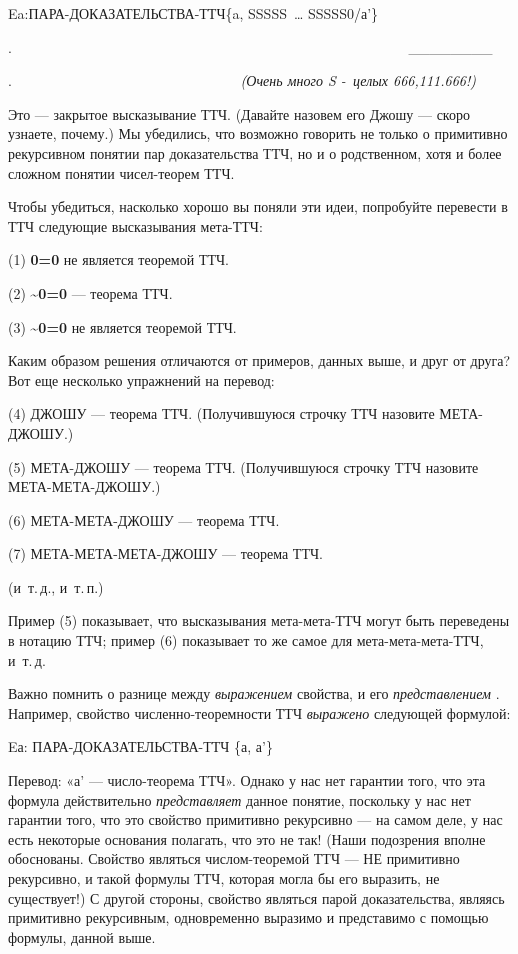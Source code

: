 \documentclass[../main.tex]{subfiles}
\begin{document}
Ea:ПАРА-ДОКАЗАТЕЛЬСТВА-ТТЧ\{a, SSSSS~\ldots{} SSSSS0/а'\}

.~~~~~~~~~~~~~~~~~~~~~~~~~~~~~~~~~~~~~~~~~~~~~~~~~~~~~~~~ \textbar\_\_\_\_\_\_\_\_\textbar~

.~~~~~~~~~~~~~~~~~~~~~~~~~~~~~~~~ \emph{(Очень много S -~целых 666,111.666!)}

Это --- закрытое высказывание ТТЧ\@. (Давайте назовем его Джошу --- скоро узнаете, почему.) Мы убедились, что возможно говорить не только о примитивно рекурсивном понятии пар доказательства ТТЧ, но и о родственном, хотя и более сложном понятии чисел-теорем ТТЧ.

Чтобы убедиться, насколько хорошо вы поняли эти идеи, попробуйте перевести в ТТЧ следующие высказывания мета-ТТЧ:

(1) \textbf{0=0} не является теоремой ТТЧ.

(2) \textbf{\textasciitilde0=0} --- теорема ТТЧ.

(3) \textbf{\textasciitilde0=0} не является теоремой ТТЧ.

Каким образом решения отличаются от примеров, данных выше, и друг от друга? Вот еще несколько упражнений на перевод:

(4) ДЖОШУ --- теорема ТТЧ\@. (Получившуюся строчку ТТЧ назовите МЕТА-ДЖОШУ.)

(5) МЕТА-ДЖОШУ --- теорема ТТЧ\@. (Получившуюся строчку ТТЧ назовите МЕТА-МЕТА-ДЖОШУ.)

(6) МЕТА-МЕТА-ДЖОШУ --- теорема ТТЧ.

(7) МЕТА-МЕТА-МЕТА-ДЖОШУ --- теорема ТТЧ.

(и~т.\,д., и~т.\,п.)

Пример (5) показывает, что высказывания мета-мета-ТТЧ могут быть переведены в нотацию ТТЧ; пример (6) показывает то же самое для мета-мета-мета-ТТЧ, и~т.\,д.

Важно помнить о разнице между \emph{выражением} свойства, и его \emph{представлением} . Например, свойство численно-теоремности ТТЧ \emph{выражено} следующей формулой:

Eа: ПАРА-ДОКАЗАТЕЛЬСТВА-ТТЧ \{а, а'\}

Перевод: «а' --- число-теорема ТТЧ». Однако у нас нет гарантии того, что эта формула действительно \emph{представляет} данное понятие, поскольку у нас нет гарантии того, что это свойство примитивно рекурсивно --- на самом деле, у нас есть некоторые основания полагать, что это не так! (Наши подозрения вполне обоснованы. Свойство являться числом-теоремой ТТЧ --- НЕ примитивно рекурсивно, и такой формулы ТТЧ, которая могла бы его выразить, не существует!) С другой стороны, свойство являться парой доказательства, являясь примитивно рекурсивным, одновременно выразимо и представимо с помощью формулы, данной выше.
\end{document}
